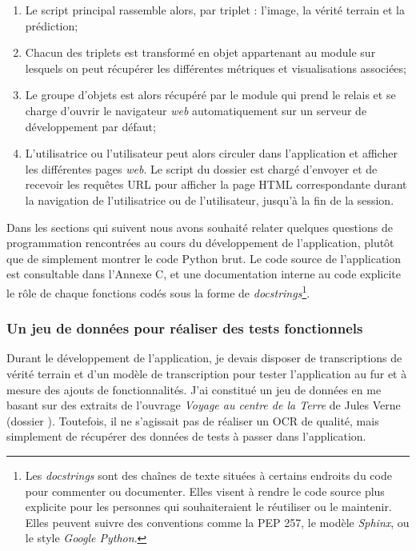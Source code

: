 \begin{enumerate}
    \item Le script principal  rassemble alors, par triplet : l'image, la vérité terrain et la prédiction;
    \item Chacun des triplets est transformé en objet  appartenant au module  sur lesquels on peut récupérer les différentes métriques et visualisations associées;
    \item Le groupe d'objets est alors récupéré par le module  qui prend le relais et se charge d'ouvrir le navigateur \textit{web} automatiquement sur un serveur de développement par défaut;
    \item L'utilisatrice ou l'utilisateur peut alors circuler dans l'application et afficher les différentes pages \textit{web}. Le script  du dossier  est chargé d'envoyer et de recevoir les requêtes URL pour afficher la page HTML correspondante durant la navigation de l'utilisatrice ou de l'utilisateur, jusqu'à la fin de la session.
\end{enumerate}

Dans les sections qui suivent nous avons souhaité relater quelques questions de programmation rencontrées au cours du développement de l'application, plutôt que de simplement montrer le code Python brut. 
Le code source de l'application est consultable dans l'Annexe C, et une documentation interne au code explicite le rôle de chaque fonctions codés sous la forme de \textit{docstrings}\footnote{Les \textit{docstrings} sont des chaînes de texte situées à certains endroits du code pour commenter ou documenter. Elles visent à rendre le code source plus explicite pour les personnes qui souhaiteraient le réutiliser ou le maintenir. Elles peuvent suivre des conventions comme la PEP 257, le modèle \textit{Sphinx}, ou le style \textit{Google Python}.}. 

\subsubsection{Un jeu de données pour réaliser des tests fonctionnels}

Durant le développement de l'application, je devais disposer de transcriptions de vérité terrain et d'un modèle de transcription pour tester l'application au fur et à mesure des ajouts de fonctionnalités. J'ai constitué un jeu de données en me basant sur des extraits de l'ouvrage \textit{Voyage au centre de la Terre} de Jules Verne (dossier ). Toutefois, il ne s'agissait pas de réaliser un OCR de qualité, mais simplement de récupérer des données de tests à passer dans l'application.

